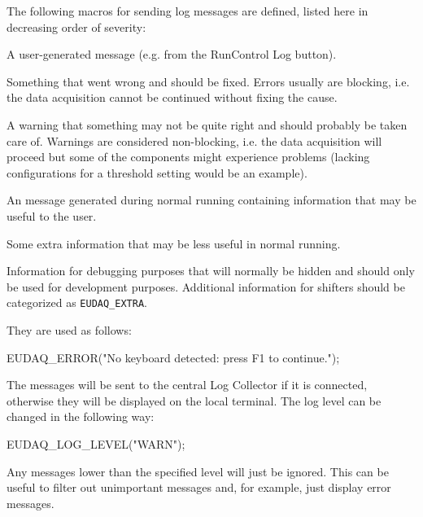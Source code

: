 The following macros for sending log messages are defined,
listed here in decreasing order of severity:
\begin{description}

A user-generated message (e.g. from the RunControl Log button).

Something that went wrong and should be fixed. Errors usually are blocking, i.e. the data acquisition cannot be continued without fixing the cause.

A warning that something may not be quite right and should probably be taken care of. Warnings are considered non-blocking, i.e. the data acquisition will proceed but some of the components might experience problems (lacking configurations for a threshold setting would be an example).

An message generated during normal running containing information that may be useful to the user.

Some extra information that may be less useful in normal running.

Information for debugging purposes that will normally be hidden and should only be used for development purposes. Additional information for shifters should be categorized as \texttt{EUDAQ\_EXTRA}.

\end{description}

They are used as follows:
\begin{listing}
EUDAQ_ERROR("No keyboard detected: press F1 to continue.");
\end{listing}

The messages will be sent to the central Log Collector if it is connected,
otherwise they will be displayed on the local terminal.
The log level can be changed in the following way:
\begin{listing}
EUDAQ_LOG_LEVEL("WARN");
\end{listing}

Any messages lower than the specified level will just be ignored.
This can be useful to filter out unimportant messages and, for example, just display error messages.
